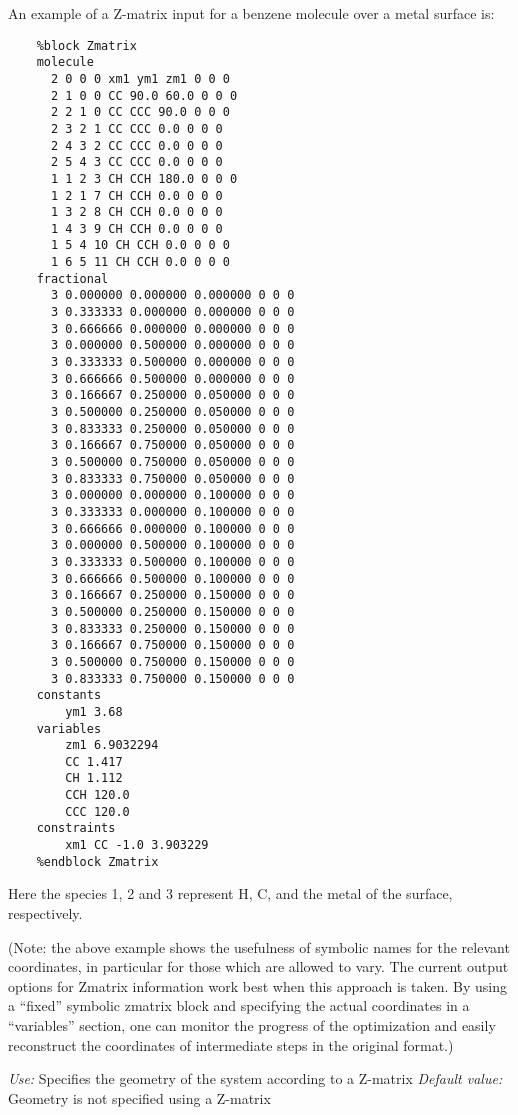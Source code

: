 \documentclass[11pt]{article}
\begin{document}
\begin{description}
An example of a Z-matrix input for a benzene molecule over a metal surface is:
\begin{verbatim}
    %block Zmatrix
    molecule
      2 0 0 0 xm1 ym1 zm1 0 0 0
      2 1 0 0 CC 90.0 60.0 0 0 0
      2 2 1 0 CC CCC 90.0 0 0 0
      2 3 2 1 CC CCC 0.0 0 0 0
      2 4 3 2 CC CCC 0.0 0 0 0
      2 5 4 3 CC CCC 0.0 0 0 0
      1 1 2 3 CH CCH 180.0 0 0 0
      1 2 1 7 CH CCH 0.0 0 0 0
      1 3 2 8 CH CCH 0.0 0 0 0
      1 4 3 9 CH CCH 0.0 0 0 0
      1 5 4 10 CH CCH 0.0 0 0 0
      1 6 5 11 CH CCH 0.0 0 0 0
    fractional
      3 0.000000 0.000000 0.000000 0 0 0
      3 0.333333 0.000000 0.000000 0 0 0
      3 0.666666 0.000000 0.000000 0 0 0
      3 0.000000 0.500000 0.000000 0 0 0
      3 0.333333 0.500000 0.000000 0 0 0
      3 0.666666 0.500000 0.000000 0 0 0
      3 0.166667 0.250000 0.050000 0 0 0
      3 0.500000 0.250000 0.050000 0 0 0
      3 0.833333 0.250000 0.050000 0 0 0
      3 0.166667 0.750000 0.050000 0 0 0
      3 0.500000 0.750000 0.050000 0 0 0
      3 0.833333 0.750000 0.050000 0 0 0
      3 0.000000 0.000000 0.100000 0 0 0
      3 0.333333 0.000000 0.100000 0 0 0
      3 0.666666 0.000000 0.100000 0 0 0
      3 0.000000 0.500000 0.100000 0 0 0
      3 0.333333 0.500000 0.100000 0 0 0
      3 0.666666 0.500000 0.100000 0 0 0
      3 0.166667 0.250000 0.150000 0 0 0
      3 0.500000 0.250000 0.150000 0 0 0
      3 0.833333 0.250000 0.150000 0 0 0
      3 0.166667 0.750000 0.150000 0 0 0
      3 0.500000 0.750000 0.150000 0 0 0
      3 0.833333 0.750000 0.150000 0 0 0
    constants
        ym1 3.68
    variables
        zm1 6.9032294
        CC 1.417
        CH 1.112
        CCH 120.0
        CCC 120.0
    constraints
        xm1 CC -1.0 3.903229
    %endblock Zmatrix
\end{verbatim}

Here the species 1, 2 and 3 represent H, C, and the metal of the
surface, respectively.

(Note: the above example shows the usefulness of symbolic names 
for the relevant coordinates, in particular for those which are
allowed to vary. The current output options for Zmatrix information
work best when this approach is taken. By using a ``fixed'' symbolic
zmatrix block and specifying the actual coordinates in a ``variables''
section, one can monitor the progress of the optimization and
easily reconstruct the coordinates of intermediate steps in the
original format.)

{\it Use:} Specifies the geometry of the system according to a Z-matrix
{\it Default value:} Geometry is not specified using a Z-matrix


\end{description}
\end{document}
